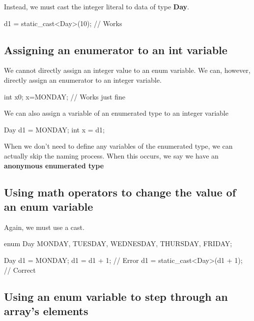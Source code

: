 \documentclass{report}
\begin{document}
    \bigbreak \noindent 
    Instead, we must cast the integer literal to data of type \textbf{Day}. 
    \bigbreak \noindent 
    
    \begin{cppcode}
d1 = static_cast<Day>(10); // Works
    \end{cppcode}
    

    \pagebreak
    \subsection{Assigning an enumerator to an int variable}
    \bigbreak \noindent 
    We cannot directly assign an integer value to an enum variable. We can, however, directly assign an enumerator to an integer variable.
    \bigbreak \noindent 
    
    \begin{cppcode}
int x{0};
x=MONDAY; // Works just fine
    \end{cppcode}
    
    \bigbreak \noindent 
    We can also assign a variable of an enumerated type to an integer variable
    \bigbreak \noindent 
    
    \begin{cppcode}
Day d1 = MONDAY;
int x = d1;
    \end{cppcode}
    
    \bigbreak \noindent 
    When we don't need to define any variables of the enumerated type, we can actually skip the naming process. When this occurs, we say we have an \textbf{anonymous enumerated type}
    \bigbreak \noindent 
    \subsection{Using math operators to change the value of an enum variable}
    \bigbreak \noindent 
    Again, we must use a cast.
    \bigbreak \noindent 
    
    \begin{cppcode}
enum Day { MONDAY, TUESDAY, WEDNESDAY, THURSDAY, FRIDAY};

Day d1 = MONDAY;
d1 = d1 + 1; // Error
d1 = static_cast<Day>(d1 + 1); // Correct
    \end{cppcode}
    

    \bigbreak \noindent 
    \subsection{Using an enum variable to step through an array's elements}
    \bigbreak \noindent 
\end{document}

